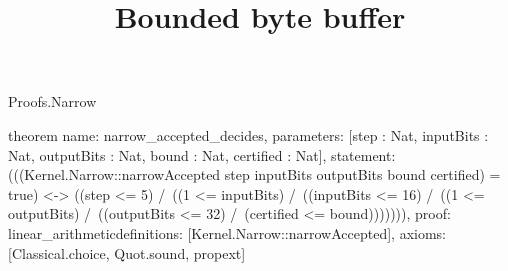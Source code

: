 \begin{lexlean}{Proofs.Narrow}
\title{Bounded byte buffer}
\begin{semanticmodule}
theorem{
  name: narrow_accepted_decides,
  parameters: [step : Nat, inputBits : Nat, outputBits : Nat, bound : Nat, certified : Nat],
  statement: (((Kernel.Narrow::narrowAccepted step inputBits outputBits bound certified) = true) <-> ((step <= 5) /\ ((1 <= inputBits) /\ ((inputBits <= 16) /\ ((1 <= outputBits) /\ ((outputBits <= 32) /\ (certified <= bound))))))),
  proof: linear_arithmetic{definitions: [Kernel.Narrow::narrowAccepted]},
  axioms: [Classical.choice, Quot.sound, propext]
}
\end{semanticmodule}
\end{lexlean}
